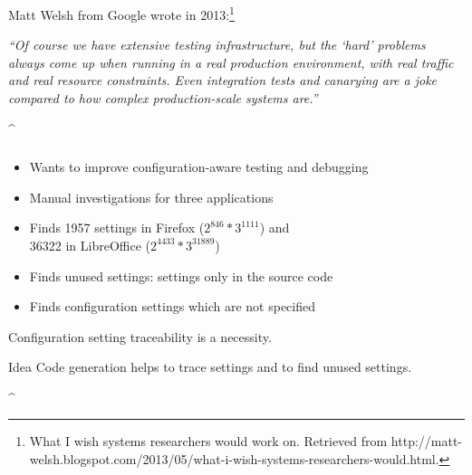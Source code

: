 \begin{frame}
	Matt Welsh from Google wrote in 2013:\footnote{What I wish systems researchers would work on. Retrieved from http://matt-welsh.blogspot.com/2013/05/what-i-wish-systems-researchers-would.html.}

	\vspace{2em}

	\emph{``Of course we have extensive testing infrastructure, but the ‘hard’ problems always
	come up when running in a real production environment, with real traffic and real
	resource constraints. Even integration tests and canarying are a joke compared to
	how complex production-scale systems are.''}
\end{frame}

\lstDeleteShortInline^
\begin{frame}
	\frametitle{\citet{jin2014configurations}}

	\begin{itemize}
	\item Wants to improve configuration-aware testing and debugging
	\item Manual investigations for three applications
	\item Finds 1957 settings in Firefox ($2^{846} * 3^{1111}$) and \\
		36322 in LibreOffice ($2^{4433} * 3^{31889}$)
	\item Finds unused settings: settings only in the source code
	\item Finds configuration settings which are not specified
	\end{itemize}

	\begin{requirement}
	Configuration setting traceability is a necessity.
	\end{requirement}

	\begin{alertblock}{Idea}
	Code generation helps to trace settings and to find unused settings.
	\end{alertblock}
\end{frame}
\lstMakeShortInline[postbreak=,keywordstyle={},showspaces=no]^


